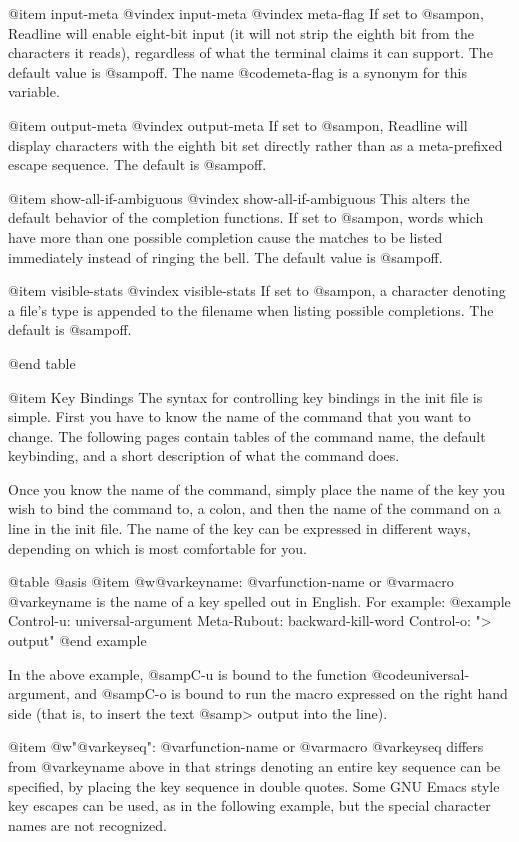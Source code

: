 @item input-meta
@vindex input-meta
@vindex meta-flag
If set to @samp{on}, Readline will enable eight-bit input (it
will not strip the eighth bit from the characters it reads),
regardless of what the terminal claims it can support.  The
default value is @samp{off}.  The name @code{meta-flag} is a
synonym for this variable.

@item output-meta
@vindex output-meta
If set to @samp{on}, Readline will display characters with the
eighth bit set directly rather than as a meta-prefixed escape
sequence.  The default is @samp{off}.

@item show-all-if-ambiguous
@vindex show-all-if-ambiguous
This alters the default behavior of the completion functions.  If
set to @samp{on}, 
words which have more than one possible completion cause the
matches to be listed immediately instead of ringing the bell.
The default value is @samp{off}.

@item visible-stats
@vindex visible-stats
If set to @samp{on}, a character denoting a file's type
is appended to the filename when listing possible
completions.  The default is @samp{off}.

@end table

@item Key Bindings
The syntax for controlling key bindings in the init file is
simple.  First you have to know the name of the command that you
want to change.  The following pages contain tables of the command name,
the default keybinding, and a short description of what the command
does.

Once you know the name of the command, simply place the name of the key
you wish to bind the command to, a colon, and then the name of the
command on a line in the init file.  The name of the key
can be expressed in different ways, depending on which is most
comfortable for you.

@table @asis
@item @w{@var{keyname}: @var{function-name} or @var{macro}}
@var{keyname} is the name of a key spelled out in English.  For example:
@example
Control-u: universal-argument
Meta-Rubout: backward-kill-word
Control-o: "> output"
@end example

In the above example, @samp{C-u} is bound to the function
@code{universal-argument}, and @samp{C-o} is bound to run the macro
expressed on the right hand side (that is, to insert the text
@samp{> output} into the line).

@item @w{"@var{keyseq}": @var{function-name} or @var{macro}}
@var{keyseq} differs from @var{keyname} above in that strings
denoting an entire key sequence can be specified, by placing
the key sequence in double quotes.  Some GNU Emacs style key
escapes can be used, as in the following example, but the
special character names are not recognized.

